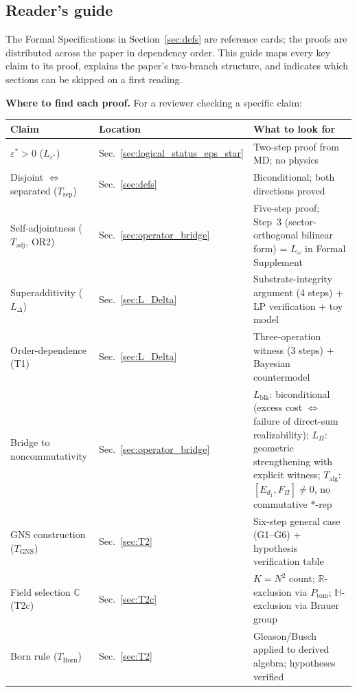 \documentclass[11pt]{article}
\theoremstyle{remark}
\begin{document}
\subsection*{Reader's guide}


The Formal Specifications in Section~\ref{sec:defs} are reference cards; the proofs are distributed across the paper in dependency order.  This guide maps every key claim to its proof, explains the paper's two-branch structure, and indicates which sections can be skipped on a first reading.

\medskip\noindent\textbf{Where to find each proof.}  For a reviewer checking a specific claim:

\smallskip
\renewcommand{\arraystretch}{1.25}
\begin{tabular}{@{}p{3.5cm}p{2.6cm}p{6.3cm}@{}}
\textbf{Claim} & \textbf{Location} & \textbf{What to look for} \\[2pt]
\hline\noalign{\smallskip}
$\varepsilon^* > 0$ ($L_{\varepsilon^*}$) & Sec.~\ref{sec:logical_status_eps_star} & Two-step proof from MD; no physics \\[2pt]
Disjoint $\Leftrightarrow$ separated ($T_{\mathrm{sep}}$) & Sec.~\ref{sec:defs} & Biconditional; both directions proved \\[2pt]
Self-adjointness ($T_{\mathrm{adj}}$, OR2) & Sec.~\ref{sec:operator_bridge} & Five-step proof; Step~3 (sector-orthogonal bilinear form) = $L_\omega$ in Formal Supplement \\[2pt]
Superadditivity ($L_\Delta$) & Sec.~\ref{sec:L_Delta} & Substrate-integrity argument (4 steps) + LP verification + toy model \\[2pt]
Order-dependence (T1) & Sec.~\ref{sec:L_Delta} & Three-operation witness (3 steps) + Bayesian countermodel \\[2pt]
Bridge to noncommutativity & Sec.~\ref{sec:operator_bridge} & $L_{\mathrm{blk}}$: biconditional (excess cost $\Leftrightarrow$ failure of direct-sum realizability); $L_\Pi$: geometric strengthening with explicit witness; $T_{\mathrm{alg}}$: $[E_{d_1}, F_\Pi] \ne 0$, no commutative $*$-rep \\[2pt]
GNS construction ($T_{\mathrm{GNS}}$) & Sec.~\ref{sec:T2} & Six-step general case (G1--G6) + hypothesis verification table \\[2pt]
Field selection $\mathbb{C}$ (T2c) & Sec.~\ref{sec:T2c} & $K = N^2$ count; $\mathbb{R}$-exclusion via $P_{\mathrm{tom}}$; $\mathbb{H}$-exclusion via Brauer group \\[2pt]
Born rule ($T_{\mathrm{Born}}$) & Sec.~\ref{sec:T2} & Gleason/Busch applied to derived algebra; hypotheses verified \\[2pt]

\end{tabular}
\end{document}
